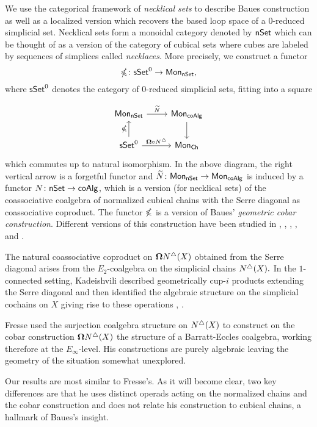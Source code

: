 We use the categorical framework of \textit{necklical sets} to describe Baues construction as well as a localized version which recovers the based loop space of a $0$-reduced simplicial set. Necklical sets form a monoidal category denoted by $\mathsf{nSet}$ which can be thought of as a version of the category of cubical sets where cubes are labeled by sequences of simplices called \textit{necklaces}. More precisely, we construct a functor $$\mathbb{\Omega} \colon \mathsf{sSet}^0 \to \mathsf{Mon}_{\mathsf{nSet}},$$ where $\mathsf{sSet}^0$ denotes the category of $0$-reduced simplicial sets, fitting into a square

\begin{equation*}
\begin{tikzcd}
\Mon_{\nSet} \arrow[r, "\widetilde{N}"] & \Mon_{\coAlg} \arrow[d] \\
\sSet^0 \arrow[r, "\cobar \circ \chains"] \arrow[u, "\gcobar"] & \Mon_{\Ch}
\end{tikzcd}
\end{equation*}
which commutes up to natural isomorphism. In the above diagram, the right vertical arrow is a forgetful functor and $\widetilde{N} \colon \mathsf{Mon}_{\mathsf{nSet}} \to \mathsf{Mon}_{\mathsf{coAlg}}$ is induced by a functor $N \colon \mathsf{nSet} \to \mathsf{coAlg}$, which is a version (for necklical sets) of the coassociative coalgebra of normalized cubical chains with the Serre diagonal as coassociative coproduct. The functor $\mathbb{\Omega}$ is a version of Baues' \textit{geometric cobar construction}. Different versions of this construction have been studied in \cite{Cordier}, \cite{Dugger, Spivak}, \cite{Kaufmann, Galvez, Tonks}, \cite{Rivera-Zeinalian}, and \cite{Berger thesis}.

The natural coassociative coproduct on $\mathbf{\Omega} N^{\triangle} (X)$ obtained from the Serre diagonal arises from the $E_2$-coalgebra on the simplicial chains $N^{\triangle}(X).$ In the $1$-connected setting, Kadeishvili described geometrically cup-$i$ products extending the Serre diagonal and then identified the algebraic structure on the simplicial cochains on $X$ giving rise to these operations \cite{Kadeishvili99coproducts},  \cite{Pilarczyk2016cubical}.

Fresse \cite{Fresse03construction} used the surjection coalgebra structure on $N^{\triangle}(X)$ to construct on the cobar construction $\mathbf{\Omega}N^{\triangle}(X)$ the  structure of a Barratt-Eccles coalgebra, working therefore at the $E_\infty$-level. His constructions are purely algebraic leaving the geometry of the situation somewhat unexplored.

Our results are most similar to Fresse's.
As it will become clear, two key differences are that he uses distinct operads acting on the normalized chains and the cobar construction and does not relate his construction to cubical chains, a hallmark of Baues's insight.

